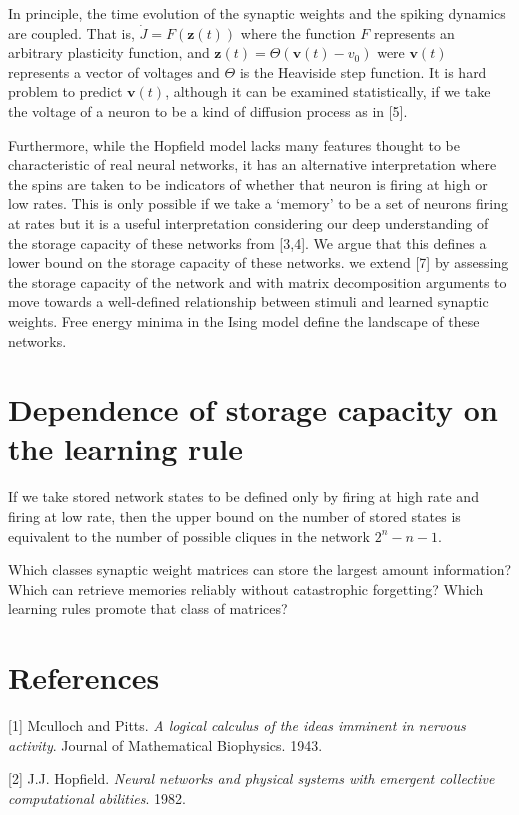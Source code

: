 \documentclass{article} %
\begin{document}
In principle, the time evolution of the synaptic weights and the spiking dynamics are coupled. That is, $\dot{J} = F(\mathbf{z}(t))$ where the function $F$ represents an arbitrary plasticity function, and $\mathbf{z}(t) = \Theta(\mathbf{v}(t)-v_{0})$ were $\mathbf{v}(t)$ represents a vector of voltages and $\Theta$ is the Heaviside step function. It is hard problem to predict $\mathbf{v}(t)$, although it can be examined statistically, if we take the voltage of a neuron to be a kind of diffusion process as in [5]. 

Furthermore, while the Hopfield model lacks many features thought to be characteristic of real neural networks, it has an alternative interpretation where the spins are taken to be indicators of whether that neuron is firing at high or low rates. This is only possible if we take a `memory' to be a set of neurons firing at rates but it is a useful interpretation considering our deep understanding of the storage capacity of these networks from [3,4]. We argue that this defines a lower bound on the storage capacity of these networks. we extend [7] by assessing the storage capacity of the network and with matrix decomposition arguments to move towards a well-defined relationship between stimuli and learned synaptic weights. Free energy minima in the Ising model define the landscape of these networks.


\section{Dependence of storage capacity on the learning rule}

If we take stored network states to be defined only by firing at high rate and firing at low rate, then the upper bound on the number of stored states is equivalent to the number of possible cliques in the network $2^{n} - n - 1$. 

Which classes synaptic weight matrices can store the largest amount information?
Which can retrieve memories reliably without catastrophic forgetting?
Which learning rules promote that class of matrices? 


\section*{References}

[1] Mculloch and Pitts. \textit{A logical calculus of the ideas imminent in nervous activity}. Journal of Mathematical Biophysics. 1943.

[2] J.J. Hopfield. \textit{Neural networks and physical systems with emergent collective computational abilities}. 1982.
\end{document}
